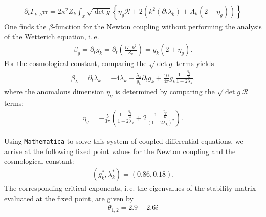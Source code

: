 \begin{align}
	\partial_{t}\Gamma_{k,h^{\text{TT}}} = 2\kappa^2 Z_k\int_x \sqrt{\operatorname{det}g} \left\{\eta_g\mathcal{R}+2\left(k^2(\partial_t\lambda_k) + \Lambda_k(2 - \eta_g)\right)\right\}
\end{align}
One finds the $\beta$-function for the Newton coupling without performing the analysis of the Wetterich equation, i.\,e. 
\begin{align}
\beta_g = \partial_t g_k = \partial_t\left(\frac{G\cdot k^2}{Z_k}\right) = g_k\left(2+\eta_g\right).
\end{align}
For the cosmological constant, comparing the $\sqrt{\operatorname{det}g}$ terms yields
\begin{align}
	\beta_{\lambda} = \partial_t\lambda_k = -4\lambda_k + \frac{\lambda_k}{g_k} \partial_t g_k + \frac{10}{4\pi}g_k\frac{1-\frac{\eta_g}{6}}{1-2\lambda_k}.
\end{align}
where the anomalous dimension $\eta_g$ is determined by comparing the $\sqrt{\operatorname{det}g}\mathcal{R}$ terms:
\begin{align}
\eta_g = -\frac{5}{3\pi} \left(\frac{1-\frac{\eta_g}{4}}{1-2\lambda_k} + 2\frac{1-\frac{\eta_g}{6}}{(1-2\lambda_k)^2}\right).	
\end{align}

Using \verb|Mathematica| to solve this system of coupled differential equations, we arrive at the following fixed point values for the Newton coupling and the cosmological constant:
\begin{align}
	(g_k^*, \lambda_k^*) = (0.86, 0.18).
\end{align}
The corresponding critical exponents, i.\,e. the eigenvalues of the stability matrix evaluated at the fixed point, are given by
\begin{align}
	\theta_{1,2} = 2.9 \pm 2.6i
\end{align}
